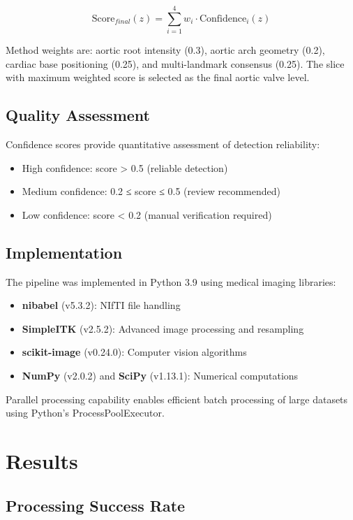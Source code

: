 \documentclass[11pt,a4paper]{article}
\begin{document}
\begin{equation}
\text{Score}_{final}(z) = \sum_{i=1}^{4} w_i \cdot \text{Confidence}_i(z)
\end{equation}

Method weights are: aortic root intensity (0.3), aortic arch geometry (0.2), cardiac base positioning (0.25), and multi-landmark consensus (0.25). The slice with maximum weighted score is selected as the final aortic valve level.

\subsection{Quality Assessment}

Confidence scores provide quantitative assessment of detection reliability:
\begin{itemize}
\item High confidence: score > 0.5 (reliable detection)
\item Medium confidence: 0.2 ≤ score ≤ 0.5 (review recommended)
\item Low confidence: score < 0.2 (manual verification required)
\end{itemize}

\subsection{Implementation}

The pipeline was implemented in Python 3.9 using medical imaging libraries:
\begin{itemize}
\item \textbf{nibabel} (v5.3.2): NIfTI file handling
\item \textbf{SimpleITK} (v2.5.2): Advanced image processing and resampling
\item \textbf{scikit-image} (v0.24.0): Computer vision algorithms
\item \textbf{NumPy} (v2.0.2) and \textbf{SciPy} (v1.13.1): Numerical computations
\end{itemize}

Parallel processing capability enables efficient batch processing of large datasets using Python's ProcessPoolExecutor.

\section{Results}

\subsection{Processing Success Rate}
\end{document}
